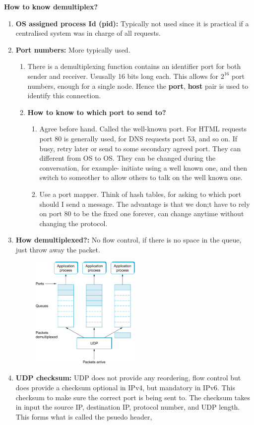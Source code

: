 \documentclass[12pt]{book}
\begin{document}
\textbf{How to know demultiplex?}
\begin{enumerate}
    \item \textbf{OS assigned process Id (pid):} Typically not used since it is practical if a centralised system was in charge of all requests.
    \item \textbf{Port numbers: } More typically used.
    \begin{enumerate}
        \item There is a demultiplexing function contains an identifier port for both sender and receiver. Ususally 16 bits long each. This allows for $2^{16}$ port numbers, enough for a single node. Hence the \textbf{port}, \textbf{host} pair is used to identify this connection.
        \item \textbf{How to know to which port to send to?}
        \begin{enumerate}
            \item Agree before hand. Called the well-known port. For HTML requests port 80 is generally used, for DNS requests port 53, and so on. If busy, retry later or send to some secondary agreed port. They can different from OS to OS. They can be changed during the conversation, for example- initiate using a well known one, and then switch to someother to allow others to talk on the well known one.
            \item Use a port mapper. Think of hash tables, for asking to which port should I send a message. The advantage is that we don;t have to rely on port 80 to be the fixed one forever, can change anytime without changing the protocol.
        \end{enumerate}
    \end{enumerate}
        \item \textbf{How demultiplexed?: }  
    No flow control, if there is no space in the queue, just throw away the packet.
    \begin{figure}[H]
        \centering
        \includegraphics[width = 0.5\textwidth]{Pictures/UDP demultiplexing.png}
    \end{figure}
    \item \textbf{UDP checksum:} UDP does not provide any reordering, flow control but does provide a checksum optional in IPv4, but mandatory in IPv6. This checksum to make sure the correct port is being sent to. The checksum takes in input the source IP, destination IP, protocol number, and UDP length. This forms what is called the psuedo header,
\end{enumerate}
\end{document}
